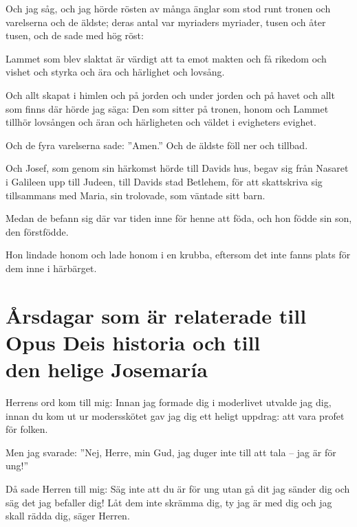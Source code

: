 {Och jag såg, och jag hörde rösten av många änglar som stod runt tronen och varelserna och de äldste; deras antal var myriaders myriader, tusen och åter tusen,
och de sade med hög röst:} 

Lammet som blev slaktat är värdigt att ta emot makten och få rikedom och vishet och styrka och ära och härlighet och lovsång.

Och allt skapat i himlen och på jorden och under jorden och på havet och allt som finns där hörde jag säga: Den som sitter på tronen, honom och Lammet tillhör lovsången och äran och härligheten och väldet i evigheters evighet.

Och de fyra varelserna sade: ''Amen.'' Och de äldste föll ner och tillbad.


{
Och Josef, som genom sin härkomst hörde till Davids hus, begav sig från Nasaret i Galileen upp till Judeen, till Davids stad Betlehem,
för att skattskriva sig tillsammans med Maria, sin trolovade, som väntade sitt barn.}

Medan de befann sig där var tiden inne för henne att föda,
och hon födde sin son, den förstfödde. 

Hon lindade honom och lade honom i en krubba, eftersom det inte fanns plats för dem inne i härbärget.

\newpage

\section[Högtider relaterade till Opus Dei]{Årsdagar som är relaterade till \\ Opus Deis historia och till \\  den helige Josemaría}


{Herrens ord kom till mig:}
Innan jag formade dig i moderlivet
utvalde jag dig,
innan du kom ut ur modersskötet
gav jag dig ett heligt uppdrag:
att vara profet för folken.

Men jag svarade: ''Nej, Herre, min Gud, jag duger inte till att tala – jag är för ung!'' 

Då sade Herren till mig:
Säg inte att du är för ung
utan gå dit jag sänder dig
och säg det jag befaller dig!
Låt dem inte skrämma dig,
ty jag är med dig
och jag skall rädda dig,
säger Herren.

